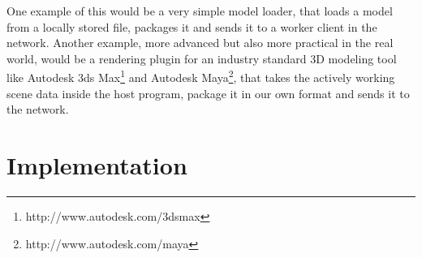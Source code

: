 One example of this would be a very simple model loader, that loads a model from a locally stored file, packages it and sends it to a worker client in the network. Another example, more advanced but also more practical in the real world, would be a rendering plugin for an industry standard 3D modeling tool like Autodesk 3ds Max\footnote{http://www.autodesk.com/3dsmax} and Autodesk Maya\footnote{http://www.autodesk.com/maya}, that takes the actively working scene data inside the host program, package it in our own format and sends it to the network.


\section{Implementation}